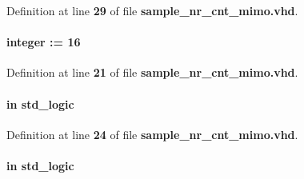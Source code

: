 Definition at line {\bf 29} of file {\bf sample\+\_\+nr\+\_\+cnt\+\_\+mimo.\+vhd}.

\paragraph[{ch\+\_\+num}]{ {\bfseries \textcolor{vhdlchar}{ }} {\bfseries \textcolor{comment}{integer}\textcolor{vhdlchar}{ }\textcolor{vhdlchar}{ }\textcolor{vhdlchar}{\+:}\textcolor{vhdlchar}{=}\textcolor{vhdlchar}{ }\textcolor{vhdlchar}{ } \textcolor{vhdldigit}{16} \textcolor{vhdlchar}{ }} \hspace{0.3cm}{\ttfamily [Generic]}}\label{classsample__nr__cnt__mimo_abafab72bb6917998129b758f19755c4c}


Definition at line {\bf 21} of file {\bf sample\+\_\+nr\+\_\+cnt\+\_\+mimo.\+vhd}.

\paragraph[{clk}]{ {\bfseries \textcolor{keywordflow}{in}\textcolor{vhdlchar}{ }} {\bfseries \textcolor{comment}{std\+\_\+logic}\textcolor{vhdlchar}{ }} \hspace{0.3cm}{\ttfamily [Port]}}\label{classsample__nr__cnt__mimo_a4a4609c199d30b3adebbeb3a01276ec5}


Definition at line {\bf 24} of file {\bf sample\+\_\+nr\+\_\+cnt\+\_\+mimo.\+vhd}.

\paragraph[{clr\+\_\+smpl\+\_\+nr}]{ {\bfseries \textcolor{keywordflow}{in}\textcolor{vhdlchar}{ }} {\bfseries \textcolor{comment}{std\+\_\+logic}\textcolor{vhdlchar}{ }} \hspace{0.3cm}{\ttfamily [Port]}}\label{classsample__nr__cnt__mimo_a7dc04539ef5d77088c29f5be14be5a27}


